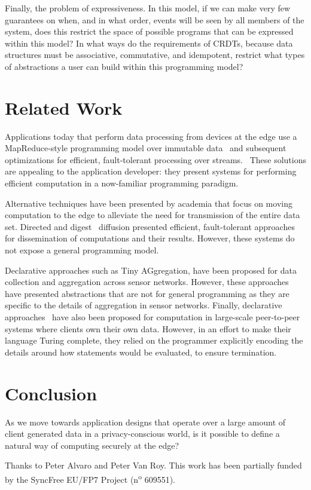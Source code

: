\documentclass[nocopyrightspace, preprint]{sigplanconf}
\theoremstyle{definition}
\theoremstyle{remark}
\begin{document}
Finally, the problem of expressiveness.  In this model, if we can make very few guarantees on when, and in what order, events will be seen by all members of the system, does this restrict the space of possible programs that can be expressed within this model?  In what ways do the requirements of CRDTs, because data structures must be associative, commutative, and idempotent, restrict what types of abstractions a user can build within this programming model?

\section{Related Work}
Applications today that perform data processing from devices at the edge use a MapReduce-style programming model over immutable data~\cite{dean2008mapreduce} and subsequent optimizations for efficient, fault-tolerant processing over streams.~\cite{zaharia2012resilient} These solutions are appealing to the application developer: they present systems for performing efficient computation in a now-familiar programming paradigm.

Alternative techniques have been presented by academia that focus on moving computation to the edge to alleviate the need for transmission of the entire data set.  Directed \cite{intanagonwiwat2000directed} and digest~\cite{zhao2003computing} diffusion presented efficient, fault-tolerant approaches for dissemination of computations and their results.  However, these systems do not expose a general programming model.

Declarative approaches such as Tiny AGgregation, \cite{madden2002tag} have been proposed for data collection and aggregation across sensor networks.  However, these approaches have presented abstractions that are not for general programming as they are specific to the details of aggregation in sensor networks.  Finally, declarative approaches~\cite{lorenz2015separation} have also been proposed for computation in large-scale peer-to-peer systems where clients own their own data.  However, in an effort to make their language Turing complete, they relied on the programmer explicitly encoding the details around how statements would be evaluated, to ensure termination. 

\section{Conclusion}
As we move towards application designs that operate over a large amount of client generated data in a privacy-conscious world, is it possible to define a natural way of computing securely at the edge?

\acks
Thanks to Peter Alvaro and Peter Van Roy.  This work has been partially funded by the SyncFree EU/FP7 Project (n\textsuperscript{o} 609551).

\balance



\end{document}
